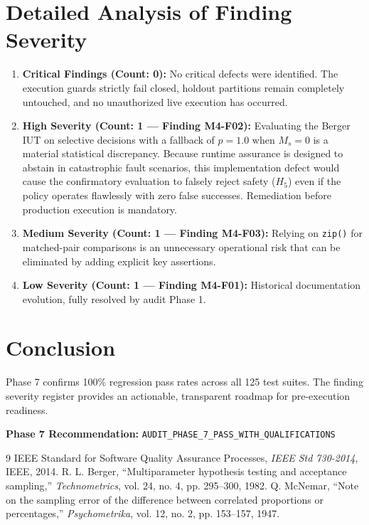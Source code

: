 \documentclass[10pt,a4paper]{article}
\begin{document}
\section{Detailed Analysis of Finding Severity}
\begin{enumerate}
    \item \textbf{Critical Findings (Count: 0):} No critical defects were identified. The execution guards strictly fail closed, holdout partitions remain completely untouched, and no unauthorized live execution has occurred.
    \item \textbf{High Severity (Count: 1 --- Finding M4-F02):} Evaluating the Berger IUT on selective decisions with a fallback of $p = 1.0$ when $M_s = 0$ is a material statistical discrepancy. Because runtime assurance is designed to abstain in catastrophic fault scenarios, this implementation defect would cause the confirmatory evaluation to falsely reject safety ($H_5$) even if the policy operates flawlessly with zero false successes. Remediation before production execution is mandatory.
    \item \textbf{Medium Severity (Count: 1 --- Finding M4-F03):} Relying on \texttt{zip()} for matched-pair comparisons is an unnecessary operational risk that can be eliminated by adding explicit key assertions.
    \item \textbf{Low Severity (Count: 1 --- Finding M4-F01):} Historical documentation evolution, fully resolved by audit Phase 1.
\end{enumerate}

\section{Conclusion}
Phase 7 confirms 100\% regression pass rates across all 125 test suites. The finding severity register provides an actionable, transparent roadmap for pre-execution readiness.

\noindent \textbf{Phase 7 Recommendation:} \texttt{AUDIT\_PHASE\_7\_PASS\_WITH\_QUALIFICATIONS}

\begin{thebibliography}{9}
 IEEE Standard for Software Quality Assurance Processes, \textit{IEEE Std 730-2014}, IEEE, 2014.
 R. L. Berger, ``Multiparameter hypothesis testing and acceptance sampling,'' \textit{Technometrics}, vol. 24, no. 4, pp. 295--300, 1982.
 Q. McNemar, ``Note on the sampling error of the difference between correlated proportions or percentages,'' \textit{Psychometrika}, vol. 12, no. 2, pp. 153--157, 1947.
\end{thebibliography}
\end{document}
